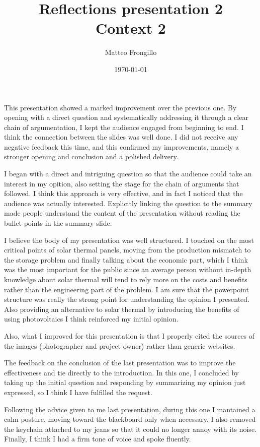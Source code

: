 \documentclass{article}
\title{\textbf{Reflections presentation 2}\\\textbf{Context 2}}
\author{Matteo Frongillo}
\date{\today}
\begin{document}
\maketitle

This presentation showed a marked improvement over the previous one. By opening with a
direct question and systematically addressing it through a clear chain of argumentation,
I kept the audience engaged from beginning to end. I think the connection between the
slides was well done. I did not receive any negative feedback this time, and this
confirmed my improvements, namely a stronger opening and conclusion and a polished delivery.

I began with a direct and intriguing question so that the audience could take an interest
in my opition, also setting the stage for the chain of arguments that followed. I think
this approach is very effective, and in fact I noticed that the audience was actually
interested. Explicitly linking the question to the summary made people understand the
content of the presentation without reading the bullet points in the summary slide.

I believe the body of my presentation was well structured. I touched on the most critical
points of solar thermal panels, moving from the production mismatch to the storage problem
and finally talking about the economic part, which I think was the most important for the
public since an average person without in-depth knowledge about solar thermal will tend to
rely more on the costs and benefits rather than the engineering part of the problem. I am
sure that the powerpoint structure was really the strong point for understanding the
opinion I presented. Also providing an alternative to solar thermal by introducing the
benefits of using photovoltaics I think reinforced my initial opinion.

Also, what I improved for this presentation is that I properly cited the sources of the
images (photographer and project owner) rather than generic websites.

The feedback on the conclusion of the last presentation was to improve the effectiveness
and tie directly to the introduction. In this one, I concluded by taking up the initial
question and responding by summarizing my opinion just expressed, so I think I have
fulfilled the request.

Following the advice given to me last presentation, during this one I mantained a calm
posture, moving toward the blackboard only when necessary. I also removed the keychain
attached to my jeans so that it could no longer annoy with its noise. Finally, I think I
had a firm tone of voice and spoke fluently.
\end{document}
